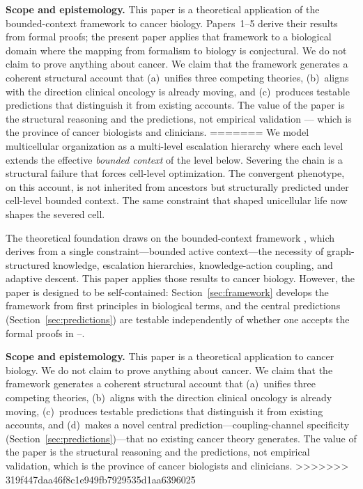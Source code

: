 \documentclass[11pt]{article}
\theoremstyle{definition}
\theoremstyle{remark}
\begin{document}
\textbf{Scope and epistemology.} This paper is a theoretical
application of the bounded-context framework to cancer biology.
Papers~1--5 derive their results from formal proofs; the present
paper applies that framework to a biological domain where the
mapping from formalism to biology is conjectural. We do not claim
to prove anything about cancer. We claim that the framework generates
a coherent structural account that (a)~unifies three competing
theories, (b)~aligns with the direction clinical oncology is already
moving, and (c)~produces testable predictions that distinguish it
from existing accounts. The value of the paper is the structural
reasoning and the predictions, not empirical validation --- which
is the province of cancer biologists and clinicians.
=======
We model multicellular organization as a multi-level escalation
hierarchy where each level extends the effective \emph{bounded
context} of the level below. Severing the chain is a structural
failure that forces cell-level optimization. The convergent
phenotype, on this account, is not inherited from ancestors but
structurally predicted under cell-level bounded context. The same
constraint that shaped unicellular life now shapes the severed cell.

The theoretical foundation draws on the bounded-context framework
\cite{McCarthy2026a, McCarthy2026b, McCarthy2026c, McCarthy2026d},
which derives from a single constraint---bounded active context---the
necessity of graph-structured knowledge, escalation hierarchies,
knowledge-action coupling, and adaptive descent. This paper applies
those results to cancer biology. However, the paper is designed to be
self-contained: Section~\ref{sec:framework} develops the framework
from first principles in biological terms, and the central
predictions (Section~\ref{sec:predictions}) are testable
independently of whether one accepts the formal proofs in
\cite{McCarthy2026a}--\cite{McCarthy2026d}.

\textbf{Scope and epistemology.} This paper is a theoretical
application to cancer biology. We do not claim to prove anything
about cancer. We claim that the framework generates a coherent
structural account that (a)~unifies three competing theories,
(b)~aligns with the direction clinical oncology is already moving,
(c)~produces testable predictions that distinguish it from existing
accounts, and (d)~makes a novel central prediction---coupling-channel
specificity (Section~\ref{sec:predictions})---that no existing cancer
theory generates. The value of the paper is the structural reasoning
and the predictions, not empirical validation, which is the province
of cancer biologists and clinicians.
>>>>>>> 319f447daa46f8c1e949fb7929535d1aa6396025
\end{document}
